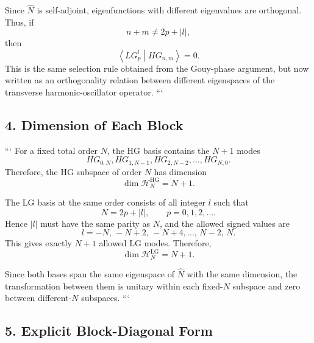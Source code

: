 \begin{resolucao}[Solution]
Since $\hat{N}$ is self-adjoint, eigenfunctions with different eigenvalues are orthogonal. Thus, if
\[
    n+m\neq 2p+|l|,
\]
then
\begin{equation}
    \left\langle
    LG_p^l
    \middle|
    HG_{n,m}
    \right\rangle
    =
    0.
    \label{eq:orthogonality_different_N}
\end{equation}
This is the same selection rule obtained from the Gouy-phase argument, but now written as an orthogonality relation between different eigenspaces of the transverse harmonic-oscillator operator.
```

\subsection*{4. Dimension of Each Block}

```
For a fixed total order $N$, the HG basis contains the $N+1$ modes
\begin{equation}
    HG_{0,N},
    HG_{1,N-1},
    HG_{2,N-2},
    \ldots,
    HG_{N,0}.
    \label{eq:HG_block_modes}
\end{equation}
Therefore, the HG subspace of order $N$ has dimension
\begin{equation}
    \dim \mathcal{H}_N^{\mathrm{HG}}=N+1.
    \label{eq:HG_block_dimension}
\end{equation}

The LG basis at the same order consists of all integer $l$ such that
\begin{equation}
    N=2p+|l|,
    \qquad
    p=0,1,2,\ldots.
    \label{eq:LG_order_constraint}
\end{equation}
Hence $|l|$ must have the same parity as $N$, and the allowed signed values are
\begin{equation}
    l=-N,\,-N+2,\,-N+4,\ldots,\,N-2,\,N.
    \label{eq:allowed_l_values}
\end{equation}
This gives exactly $N+1$ allowed LG modes. Therefore,
\begin{equation}
    \dim \mathcal{H}_N^{\mathrm{LG}}=N+1.
    \label{eq:LG_block_dimension}
\end{equation}

Since both bases span the same eigenspace of $\hat{N}$ with the same dimension, the transformation between them is unitary within each fixed-$N$ subspace and zero between different-$N$ subspaces.
```

\subsection*{5. Explicit Block-Diagonal Form}


\end{resolucao}
